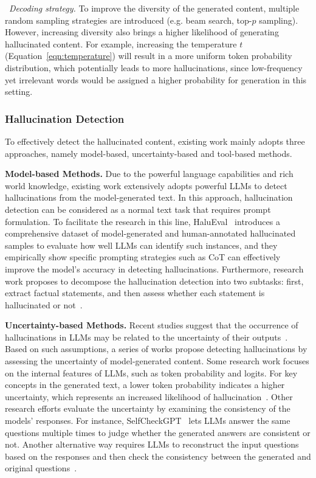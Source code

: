 \textbullet~\emph{Decoding strategy.} To improve the diversity of the generated content, multiple random sampling strategies are introduced (e.g. beam search, top-$p$ sampling). However, increasing diversity also brings a higher likelihood of generating hallucinated content. For example, increasing the temperature $t$ (Equation~\ref{eqn:temperature}) will result in a more uniform token probability distribution,  which potentially leads to more hallucinations, since low-frequency yet irrelevant words would be assigned a higher probability for generation in this setting.

\subsubsection{Hallucination Detection} To effectively detect the hallucinated content, existing work mainly adopts three approaches, namely model-based, uncertainty-based and tool-based methods.

\textbf{Model-based Methods.} Due to the powerful language capabilities and rich world knowledge, existing work extensively adopts powerful LLMs to detect hallucinations from the model-generated text. In this approach, hallucination detection can be considered as a normal text task that requires prompt formulation. To facilitate the research in  this line, HaluEval~\cite{Li-arxiv-2023-HaluEval} introduces a comprehensive dataset of model-generated and human-annotated hallucinated samples to evaluate how well LLMs can identify such instances, and they empirically show specific prompting strategies such as CoT can effectively improve the model's accuracy in detecting hallucinations. Furthermore, research work proposes to decompose the hallucination detection into two subtasks: first, extract factual statements, and then assess whether each statement is hallucinated or not~\cite{Li-arxiv-2024-dawn, Dhuliawala-arxiv-2023-chain}. 

\textbf{Uncertainty-based  Methods.} Recent studies suggest that the occurrence of hallucinations in LLMs may be related to the uncertainty of their outputs~\cite{Manakul-emnlp-2023-selfcheckgpt}. Based on such assumptions, a series of works propose detecting hallucinations by assessing the uncertainty of model-generated content. Some research work focuses on the internal features of LLMs, such as token probability and logits. For key concepts in the generated text, a lower token probability indicates a higher uncertainty, which represents an increased likelihood of hallucination~\cite{Varshney-arxiv-2023-stitch}. Other research efforts evaluate the uncertainty by examining the consistency of the models' responses. For instance, SelfCheckGPT~\cite{Manakul-emnlp-2023-selfcheckgpt} lets LLMs answer the same questions multiple times to judge whether the generated answers are consistent or not. Another alternative way requires LLMs to reconstruct the input questions based on the responses and then check the consistency between the generated and original questions~\cite{Yehuda-arxiv-2023-search}.

